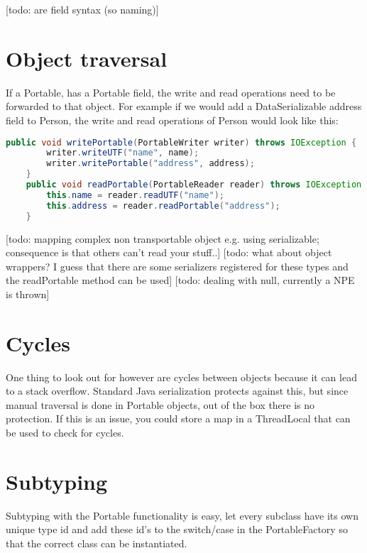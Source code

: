 [todo: are field syntax (so naming)]

\section{Object traversal}
If a Portable, has a Portable field, the write and read operations need to be forwarded to that object. For example if we would add a DataSerializable address field to Person, the write and read operations of Person would look like this:
\begin{lstlisting}[language=java]
    public void writePortable(PortableWriter writer) throws IOException {
        writer.writeUTF("name", name);
        writer.writePortable("address", address);
    }
    public void readPortable(PortableReader reader) throws IOException {
        this.name = reader.readUTF("name");
        this.address = reader.readPortable("address");
    }
\end{lstlisting}
[todo: mapping complex non transportable object e.g. using serializable; consequence is that others can't read your stuff..]
[todo: what about object wrappers? I guess that there are some serializers registered for these types and the readPortable method can be used]
[todo: dealing with null, currently a NPE is thrown]

\section{Cycles}
One thing to look out for however are cycles between objects because it can lead to a stack overflow. Standard Java serialization protects against this, but since manual traversal is done in Portable objects, out of the box there is no protection. If this is an issue, you could store a map in a ThreadLocal that can be used to check for cycles.

\section{Subtyping}
Subtyping with the Portable functionality is easy, let every subclass have its own unique type id and add these id's to the switch/case in the PortableFactory so that the correct class can be instantiated. 

